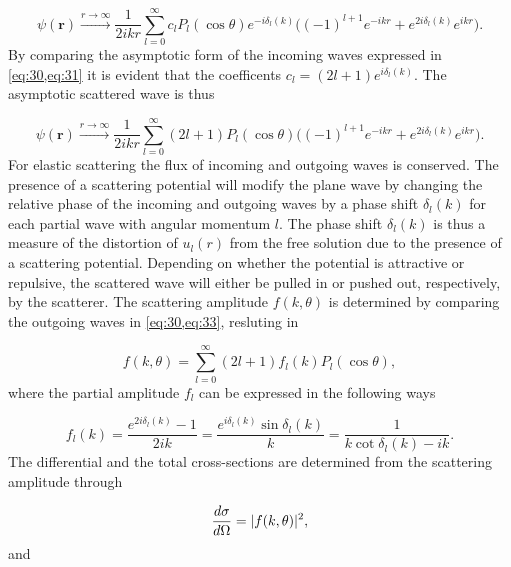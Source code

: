 \begin{equation}\label{eq:31}
\psi(\mathbf{r}) \xrightarrow{r \to \infty} \frac{1}{2ikr} \sum_{l=0}^{\infty} c_l P_l(\cos\theta) e^{-i\delta_l(k)} \big((-1)^{l+1}e^{-ikr} + e^{2i\delta_l(k)}e^{ikr}\big).
\end{equation} 
By comparing the asymptotic form of the incoming waves expressed in \cref{eq:30,eq:31} it is evident that the coefficents $c_l = (2l+1)e^{i\delta_l(k)}$. The asymptotic scattered wave is thus

\begin{equation}\label{eq:33}
\psi(\mathbf{r}) \xrightarrow{r \to \infty} \frac{1}{2ikr} \sum_{l=0}^{\infty} (2l+1) P_l(\cos\theta)\big((-1)^{l+1}e^{-ikr} + e^{2i\delta_l(k)}e^{ikr}\big).
\end{equation}
For elastic scattering the flux of incoming and outgoing waves is conserved. The presence of a scattering potential will modify the plane wave by changing the relative phase of the incoming and outgoing waves by a phase shift $\delta_l(k)$ for each partial wave with angular momentum $l$. The phase shift $\delta_l(k)$ is thus a measure of the distortion of $u_l(r)$ from the free solution due to the presence of a scattering potential. Depending on whether the potential is attractive or repulsive, the scattered wave will either be pulled in or pushed out, respectively, by the scatterer. The scattering amplitude $f(k,\theta)$ is determined by comparing the outgoing waves in \cref{eq:30,eq:33}, resluting in

\begin{equation}
f(k,\theta) = \sum_{l=0}^{\infty} (2l+1)f_l(k)P_l(\cos\theta),
\end{equation}
where the partial amplitude $f_l$ can be expressed in the following ways

\begin{equation}\label{eq:partialamp}
f_l(k) = \frac{e^{2i\delta_l(k)}-1}{2ik} = \frac{e^{i\delta_l(k)}\sin\delta_l(k)}{k} = \frac{1}{k\cot\delta_l(k) - ik}. 
\end{equation}
The differential and the total cross-sections are determined from the scattering amplitude through 

\begin{equation}
\frac{d\sigma}{d\Omega}=\lvert f(k,\theta)\rvert^2,
\end{equation}
and

